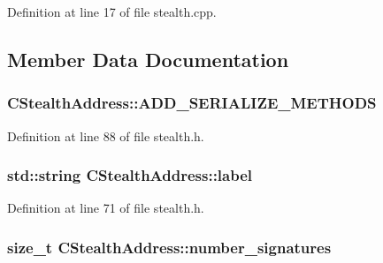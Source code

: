 Definition at line 17 of file stealth.\+cpp.



\subsection{Member Data Documentation}
\hypertarget{class_c_stealth_address_aca7a00fad5200f051b29be4775fdd079}{}
\subsubsection[{A\+D\+D\+\_\+\+S\+E\+R\+I\+A\+L\+I\+Z\+E\+\_\+\+M\+E\+T\+H\+O\+D\+S}]{\setlength{\rightskip}{0pt plus 5cm}C\+Stealth\+Address\+::\+A\+D\+D\+\_\+\+S\+E\+R\+I\+A\+L\+I\+Z\+E\+\_\+\+M\+E\+T\+H\+O\+D\+S}\label{class_c_stealth_address_aca7a00fad5200f051b29be4775fdd079}


Definition at line 88 of file stealth.\+h.

\hypertarget{class_c_stealth_address_a55084bdf98f10d5d5451ca73cc3f2395}{}
\subsubsection[{label}]{\setlength{\rightskip}{0pt plus 5cm}std\+::string C\+Stealth\+Address\+::label\hspace{0.3cm}{\ttfamily [mutable]}}\label{class_c_stealth_address_a55084bdf98f10d5d5451ca73cc3f2395}


Definition at line 71 of file stealth.\+h.

\hypertarget{class_c_stealth_address_a5c4d8f08483d31c17e6e711cdbe705ef}{}
\subsubsection[{number\+\_\+signatures}]{\setlength{\rightskip}{0pt plus 5cm}size\+\_\+t C\+Stealth\+Address\+::number\+\_\+signatures}\label{class_c_stealth_address_a5c4d8f08483d31c17e6e711cdbe705ef}


